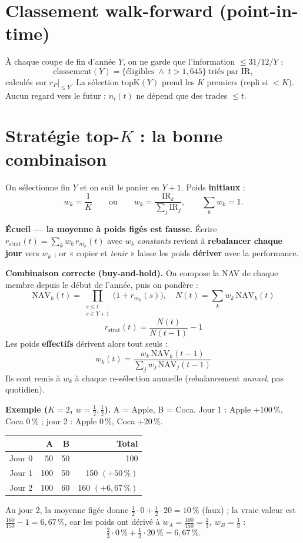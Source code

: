 \documentclass[10pt,a4paper,twocolumn]{article}
\begin{document}
\section{Classement walk-forward (point-in-time)}
À chaque coupe de fin d'année $Y$, on ne garde que l'information $\le 31/12/Y$ :
$$\mathrm{classement}(Y)=\big\{\text{éligibles} \;\wedge\; t>1{,}645\big\}\ \text{triés par } \mathrm{IR},$$
calculés sur $r_P\big|_{\le Y}$. La sélection $\mathrm{topK}(Y)$ prend les $K$ premiers (repli si $<K$).
Aucun regard vers le futur : $n_i(t)$ ne dépend que des trades $\le t$.

\section{Stratégie top-\texorpdfstring{$K$}{K} : la bonne combinaison}
On sélectionne fin $Y$ et on suit le panier en $Y{+}1$. Poids \textbf{initiaux} :
$$w_k=\frac1K \qquad\text{ou}\qquad w_k=\frac{\mathrm{IR}_k}{\sum_j \mathrm{IR}_j},\qquad \sum_k w_k=1.$$

\textbf{Écueil --- la moyenne à poids figés est fausse.} Écrire
$r_{\text{strat}}(t)=\sum_k w_k\,r_{m_k}(t)$ avec $w_k$ \emph{constants} revient à \textbf{rebalancer
chaque jour} vers $w_k$ ; or « copier et \emph{tenir} » laisse les poids \textbf{dériver} avec la performance.

\textbf{Combinaison correcte (buy-and-hold).} On compose la NAV de chaque membre depuis le début de l'année,
puis on pondère :
$$\mathrm{NAV}_k(t)=\!\!\prod_{\substack{s\le t\\ s\in Y+1}}\!\!\big(1+r_{m_k}(s)\big),\quad
  N(t)=\sum_k w_k\,\mathrm{NAV}_k(t)$$
$$\boxed{\,r_{\text{strat}}(t)=\frac{N(t)}{N(t-1)}-1\,}$$
Les poids \textbf{effectifs} dérivent alors tout seuls :
$$w_k(t)=\frac{w_k\,\mathrm{NAV}_k(t-1)}{\sum_j w_j\,\mathrm{NAV}_j(t-1)}$$
Ils sont remis à $w_k$ à chaque re-sélection annuelle (rebalancement \emph{annuel}, pas quotidien).

\textbf{Exemple ($K=2$, $w=\tfrac12,\tfrac12$).} A = Apple, B = Coca. Jour 1 : Apple $+100\,\%$,
Coca $0\,\%$ ; jour 2 : Apple $0\,\%$, Coca $+20\,\%$.

\begin{center}\small\setlength{\tabcolsep}{5pt}
\begin{tabular}{lrrr}
\toprule
 & A & B & Total\\
\midrule
Jour 0 & 50 & 50 & 100\\
Jour 1 & 100 & 50 & 150 \;$(+50\,\%)$\\
Jour 2 & 100 & 60 & 160 \;$(+6{,}67\,\%)$\\
\bottomrule
\end{tabular}
\end{center}
Au jour 2, la moyenne figée donne $\tfrac12\!\cdot\!0+\tfrac12\!\cdot\!20 = 10\,\%$ (faux) ; la vraie
valeur est $\tfrac{160}{150}-1 = 6{,}67\,\%$, car les poids ont dérivé à
$w_A=\tfrac{100}{150}=\tfrac23,\ w_B=\tfrac13$ :
$$\tfrac23\!\cdot\!0\,\% + \tfrac13\!\cdot\!20\,\% = 6{,}67\,\%.$$
\end{document}
